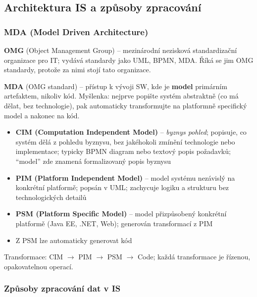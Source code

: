 \subsection{Architektura IS a způsoby zpracování}

\subsubsection{MDA (Model Driven Architecture)}

\textbf{OMG} (Object Management Group) -- mezinárodní nezisková standardizační organizace pro IT;
vydává standardy jako UML, BPMN, MDA. Říká se jim OMG standardy, protože za nimi stojí tato organizace.

\textbf{MDA} (OMG standard) -- přístup k vývoji SW, kde je \textbf{model} primárním artefaktem, nikoliv kód.
Myšlenka: nejprve popište systém abstraktně (co má dělat, bez technologie), pak automaticky transformujte na platformně specifický model a nakonec na kód.

\begin{itemize}
  \item \textbf{CIM (Computation Independent Model)} -- \textit{byznys pohled}; popisuje, co systém dělá z pohledu byznysu, bez jakéhokoli zmínění technologie nebo implementace; typicky BPMN diagram nebo textový popis požadavků; ``model'' zde znamená formalizovaný popis byznysu
  \item \textbf{PIM (Platform Independent Model)} -- model systému nezávislý na konkrétní platformě;
    popsán v UML; zachycuje logiku a strukturu bez technologických detailů
  \item \textbf{PSM (Platform Specific Model)} -- model přizpůsobený konkrétní platformě (Java EE, .NET, Web);
    generován transformací z PIM
  \item Z PSM lze automaticky generovat kód
\end{itemize}

Transformace: CIM $\to$ PIM $\to$ PSM $\to$ Code; každá transformace je řízenou, opakovatelnou operací.

\subsubsection{Způsoby zpracování dat v IS}

